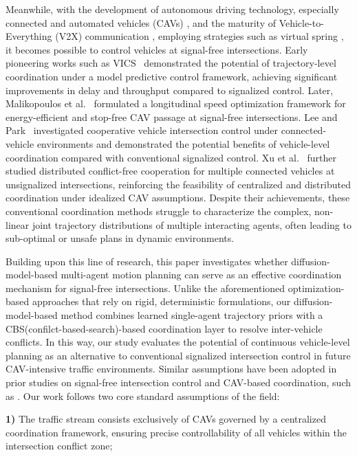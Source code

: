 \documentclass[journal]{IEEEtran}
\begin{document}
Meanwhile, with the development of autonomous driving technology, especially connected and automated vehicles (CAVs) \cite{guanetti2018}, and the maturity of Vehicle-to-Everything (V2X) communication \cite{yoshizawa2023}, employing strategies such as virtual spring \cite{gong2024}, it becomes possible to control vehicles at signal-free intersections. Early pioneering works such as VICS~\cite{kamal2015} demonstrated the potential of trajectory-level coordination under a model predictive control framework, achieving significant improvements in delay and throughput compared to signalized control. Later, Malikopoulos et al.~\cite{malikopoulos2018} formulated a longitudinal speed optimization framework for energy-efficient and stop-free CAV passage at signal-free intersections. Lee and Park~\cite{lee2012} investigated cooperative vehicle intersection control under connected-vehicle environments and demonstrated the potential benefits of vehicle-level coordination compared with conventional signalized control. Xu et al.~\cite{xu2018} further studied distributed conflict-free cooperation for multiple connected vehicles at unsignalized intersections, reinforcing the feasibility of centralized and distributed coordination under idealized CAV assumptions. Despite their achievements, these conventional coordination methods struggle to characterize the complex, non-linear joint trajectory distributions of multiple interacting agents, often leading to sub-optimal or unsafe plans in dynamic environments.

Building upon this line of research, this paper investigates whether diffusion-model-based multi-agent motion planning can serve as an effective coordination mechanism for signal-free intersections. Unlike the aforementioned optimization-based approaches that rely on rigid, deterministic formulations, our diffusion-model-based method combines learned single-agent trajectory priors with a CBS(confilct-based-search)-based coordination layer to resolve inter-vehicle conflicts. In this way, our study evaluates the potential of continuous vehicle-level planning as an alternative to conventional signalized intersection control in future CAV-intensive traffic environments. Similar assumptions have been adopted in prior studies on signal-free intersection control and CAV-based coordination, such as \cite{xu2018}. Our work follows two core standard assumptions of the field:


\textbf{1)} The traffic stream consists exclusively of CAVs governed by a centralized coordination framework, ensuring precise controllability of all vehicles within the intersection conflict zone;
\end{document}
